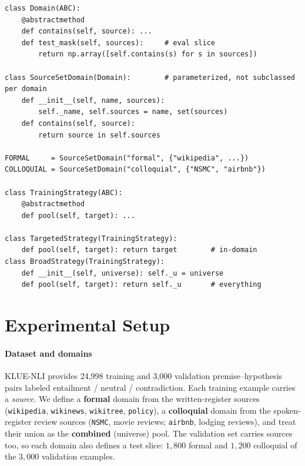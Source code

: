 \documentclass[conference]{IEEEtran}
\begin{document}
\begin{lstlisting}[caption={The data axis as objects: a \texttt{Domain}
is both a training pool and a test slice; the formal and colloquial
domains are two \emph{instances} of one parameterized
\texttt{SourceSetDomain}; a \texttt{TrainingStrategy} maps a target to a
training pool.}, label={lst:strategy}]
class Domain(ABC):
    @abstractmethod
    def contains(self, source): ...
    def test_mask(self, sources):     # eval slice
        return np.array([self.contains(s) for s in sources])

class SourceSetDomain(Domain):        # parameterized, not subclassed per domain
    def __init__(self, name, sources):
        self._name, self.sources = name, set(sources)
    def contains(self, source):
        return source in self.sources

FORMAL     = SourceSetDomain("formal", {"wikipedia", ...})
COLLOQUIAL = SourceSetDomain("colloquial", {"NSMC", "airbnb"})

class TrainingStrategy(ABC):
    @abstractmethod
    def pool(self, target): ...

class TargetedStrategy(TrainingStrategy):
    def pool(self, target): return target        # in-domain
class BroadStrategy(TrainingStrategy):
    def __init__(self, universe): self._u = universe
    def pool(self, target): return self._u       # everything
\end{lstlisting}

\section{Experimental Setup}
\label{sec:setup}

\paragraph*{Dataset and domains}
KLUE-NLI \cite{park2021klue} provides 24{,}998 training and 3{,}000
validation premise--hypothesis pairs labeled entailment / neutral /
contradiction. Each training example carries a \emph{source}. We define a
\textbf{formal} domain from the written-register sources
(\texttt{wikipedia}, \texttt{wikinews}, \texttt{wikitree},
\texttt{policy}), a \textbf{colloquial} domain from the spoken-register
review sources (\texttt{NSMC}, movie reviews; \texttt{airbnb}, lodging
reviews), and treat their union as the \textbf{combined} (universe) pool.
The validation set carries sources too, so each domain also defines a
test slice: $1{,}800$ formal and $1{,}200$ colloquial of the $3{,}000$
validation examples.
\end{document}
